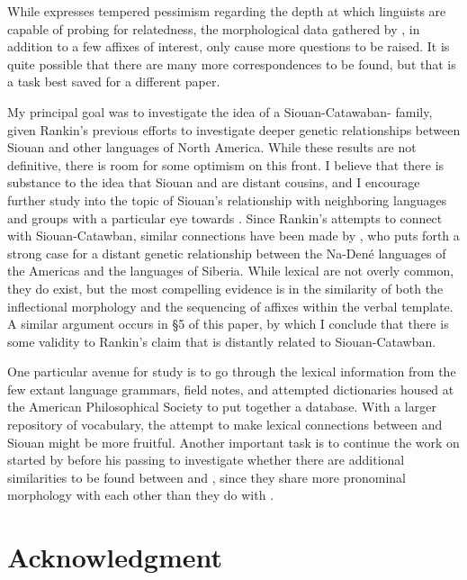 \documentclass[output=paper]{LSP/langsci}
\begin{document}
While \citet{Rankin1996} expresses tempered pessimism regarding the depth at which linguists are capable of probing for relatedness, the morphological data gathered by \citet{Rankin1998scy}, in addition to a few affixes of interest, only cause more questions to be raised. It is quite possible that there are many more correspondences to be found, but that is a task best saved for a different paper.

My principal goal was to investigate the idea of a Siouan-Catawaban- family, given Rankin's \citeyear{Rankin1996,Rankin1998scy} previous efforts to investigate deeper genetic relationships between Siouan and other languages of North America. While these results are not definitive, there is room for some optimism on this front. I believe that there is substance to the idea that Siouan and  are distant cousins, and I encourage further study into the topic of Siouan's relationship with neighboring languages and groups with a particular eye towards . Since Rankin's attempts to connect  with Siouan-Catawban, similar connections have been made by \citet{Vajda2010}, who puts forth a strong case for a distant genetic relationship between the Na-Den\'e languages of the Americas and the  languages of Siberia. While lexical  are not overly common, they do exist, but the most compelling evidence is in the similarity of both the inflectional morphology and the sequencing of affixes within the verbal template. A similar argument occurs in \S5 of this paper, by which I conclude that there is some validity to Rankin's claim that  is distantly related to Siouan-Catawban.

One particular avenue for study is to go through the lexical information from the few extant  language grammars, field notes, and attempted dictionaries housed at the American Philosophical Society to put together a  database. With a larger repository of  vocabulary, the attempt to make lexical connections between  and Siouan might be more fruitful. Another important task is to continue the work on  started by \citet{Rudes2007} before his passing to investigate whether there are additional similarities to be found between  and , since they share more pronominal morphology with each other than they do with .

\section*{Acknowledgment}
\end{document}
